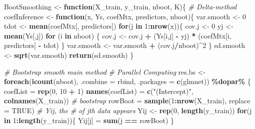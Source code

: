 \documentclass[
]{article}
\newenvironment{Shaded}{\begin{snugshade}}{\end{snugshade}}
\newcommand{\AttributeTok}[1]{\textcolor[rgb]{0.13,0.29,0.53}{#1}}
\newcommand{\CommentTok}[1]{\textcolor[rgb]{0.56,0.35,0.01}{\textit{#1}}}
\newcommand{\ConstantTok}[1]{\textcolor[rgb]{0.56,0.35,0.01}{#1}}
\newcommand{\ControlFlowTok}[1]{\textcolor[rgb]{0.13,0.29,0.53}{\textbf{#1}}}
\newcommand{\DecValTok}[1]{\textcolor[rgb]{0.00,0.00,0.81}{#1}}
\newcommand{\FunctionTok}[1]{\textcolor[rgb]{0.13,0.29,0.53}{\textbf{#1}}}
\newcommand{\NormalTok}[1]{#1}
\newcommand{\OtherTok}[1]{\textcolor[rgb]{0.56,0.35,0.01}{#1}}
\newcommand{\SpecialCharTok}[1]{\textcolor[rgb]{0.81,0.36,0.00}{\textbf{#1}}}
\newcommand{\StringTok}[1]{\textcolor[rgb]{0.31,0.60,0.02}{#1}}
\begin{document}
\begin{Shaded}
\begin{Highlighting}[]
\NormalTok{BootSmoothing }\OtherTok{\textless{}{-}} \ControlFlowTok{function}\NormalTok{(X\_train, y\_train, nboot, K)\{}
    \CommentTok{\# Delta{-}method}
\NormalTok{    coefInference }\OtherTok{\textless{}{-}} \ControlFlowTok{function}\NormalTok{(x, Ys, coefMtx, predictors, nboot)\{}
\NormalTok{        var.smooth }\OtherTok{\textless{}{-}} \DecValTok{0}
\NormalTok{        tdot }\OtherTok{\textless{}{-}} \FunctionTok{mean}\NormalTok{(coefMtx[, predictors])}
        \ControlFlowTok{for}\NormalTok{(j }\ControlFlowTok{in} \DecValTok{1}\SpecialCharTok{:}\FunctionTok{nrow}\NormalTok{(x))\{}
\NormalTok{            cov.j }\OtherTok{\textless{}{-}} \DecValTok{0}
\NormalTok{            yj }\OtherTok{\textless{}{-}} \FunctionTok{mean}\NormalTok{(Ys[,j])}
            \ControlFlowTok{for}\NormalTok{ (i }\ControlFlowTok{in}\NormalTok{ nboot) \{}
\NormalTok{                cov.j }\OtherTok{\textless{}{-}}\NormalTok{ cov.j }\SpecialCharTok{+}\NormalTok{ (Ys[i,j] }\SpecialCharTok{{-}}\NormalTok{ yj) }\SpecialCharTok{*}\NormalTok{ (coefMtx[i, predictors] }\SpecialCharTok{{-}}\NormalTok{ tdot)}
\NormalTok{            \}}
\NormalTok{            var.smooth }\OtherTok{\textless{}{-}}\NormalTok{ var.smooth }\SpecialCharTok{+}\NormalTok{ (cov.j}\SpecialCharTok{/}\NormalTok{nboot)}\SpecialCharTok{\^{}}\DecValTok{2}
\NormalTok{        \}}
\NormalTok{        sd.smooth }\OtherTok{\textless{}{-}} \FunctionTok{sqrt}\NormalTok{(var.smooth)}
        \FunctionTok{return}\NormalTok{(sd.smooth)}
\NormalTok{    \}}

    \CommentTok{\# Bootstrap smooth main method}
    \CommentTok{\# Parallel Computing}
\NormalTok{    res.bs }\OtherTok{\textless{}{-}} \FunctionTok{foreach}\NormalTok{(}\FunctionTok{icount}\NormalTok{(nboot), }\AttributeTok{.combine =}\NormalTok{ rbind, }\AttributeTok{.packages =} \FunctionTok{c}\NormalTok{(}\StringTok{\textquotesingle{}glmnet\textquotesingle{}}\NormalTok{)) }\SpecialCharTok{\%dopar\%}\NormalTok{ \{}
\NormalTok{        coefList }\OtherTok{=} \FunctionTok{rep}\NormalTok{(}\DecValTok{0}\NormalTok{, }\DecValTok{10} \SpecialCharTok{+} \DecValTok{1}\NormalTok{)}
        \FunctionTok{names}\NormalTok{(coefList) }\OtherTok{=} \FunctionTok{c}\NormalTok{(}\StringTok{"(Intercept)"}\NormalTok{, }\FunctionTok{colnames}\NormalTok{(X\_train))}
        \CommentTok{\# bootstrap}
\NormalTok{        rowBoot }\OtherTok{=} \FunctionTok{sample}\NormalTok{(}\DecValTok{1}\SpecialCharTok{:}\FunctionTok{nrow}\NormalTok{(X\_train), }\AttributeTok{replace =} \ConstantTok{TRUE}\NormalTok{)}
        \CommentTok{\# Yij, the \# of jth data appears}
\NormalTok{        Yij }\OtherTok{\textless{}{-}} \FunctionTok{rep}\NormalTok{(}\DecValTok{0}\NormalTok{, }\FunctionTok{length}\NormalTok{(y\_train))}
        \ControlFlowTok{for}\NormalTok{(j }\ControlFlowTok{in} \DecValTok{1}\SpecialCharTok{:}\FunctionTok{length}\NormalTok{(y\_train))\{}
\NormalTok{            Yij[j] }\OtherTok{=} \FunctionTok{sum}\NormalTok{(j }\SpecialCharTok{==}\NormalTok{ rowBoot)}
\NormalTok{        \}}
        

\end{Highlighting}
\end{Shaded}
\end{document}
